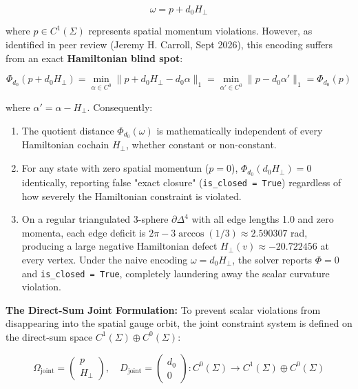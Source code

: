 \documentclass[11pt]{article}
\begin{document}
\begin{equation*}
\omega = p + d_0 H_\perp
\end{equation*}

where $p \in C^1(\Sigma)$ represents spatial momentum violations. However, as identified in peer review (Jeremy H. Carroll, Sept 2026), this encoding suffers from an exact \textbf{Hamiltonian blind spot}:

\begin{equation*}
\Phi_{d_0}(p + d_0 H_\perp) = \min_{\alpha \in C^0} \|p + d_0 H_\perp - d_0 \alpha\|_1 = \min_{\alpha' \in C^0} \|p - d_0 \alpha'\|_1 = \Phi_{d_0}(p)
\end{equation*}

where $\alpha' = \alpha - H_\perp$. Consequently:

\begin{enumerate}[leftmargin=1.4em,itemsep=0.2em]
\item The quotient distance $\Phi_{d_0}(\omega)$ is mathematically independent of every Hamiltonian cochain $H_\perp$, whether constant or non-constant.
\item For any state with zero spatial momentum ($p = 0$), $\Phi_{d_0}(d_0 H_\perp) = 0$ identically, reporting false "exact closure" (\texttt{is\_closed = True}) regardless of how severely the Hamiltonian constraint is violated.
\item On a regular triangulated 3-sphere $\partial\Delta^4$ with all edge lengths 1.0 and zero momenta, each edge deficit is $2\pi - 3\arccos(1/3) \approx 2.590307$ rad, producing a large negative Hamiltonian defect $H_\perp(v) \approx -20.722456$ at every vertex. Under the naive encoding $\omega = d_0 H_\perp$, the solver reports $\Phi = 0$ and \texttt{is\_closed = True}, completely laundering away the scalar curvature violation.
\end{enumerate}
\textbf{The Direct-Sum Joint Formulation:} To prevent scalar violations from disappearing into the spatial gauge orbit, the joint constraint system is defined on the direct-sum space $C^1(\Sigma) \oplus C^0(\Sigma)$:

\begin{equation*}
\Omega_{\mathrm{joint}} = \begin{pmatrix} p \\ H_\perp \end{pmatrix}, \quad D_{\mathrm{joint}} = \begin{pmatrix} d_0 \\ 0 \end{pmatrix} : C^0(\Sigma) \to C^1(\Sigma) \oplus C^0(\Sigma)
\end{equation*}
\end{document}
